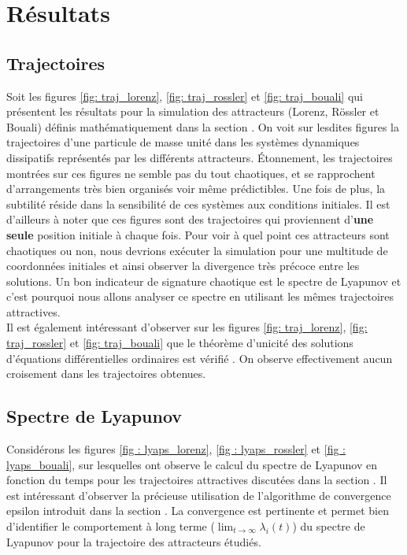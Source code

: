 \section{Résultats} \label{sec: resultats}

\subsection{Trajectoires} \label{subsec: res_trajectories}
    Soit les figures \ref{fig: traj_lorenz}, \ref{fig: traj_rossler} et
    \ref{fig: traj_bouali} qui présentent les résultats pour la simulation des
    attracteurs (Lorenz, Rössler et Bouali) définis mathématiquement dans la
    section . On voit sur lesdites figures la trajectoires
    d'une particule de masse unité dans les systèmes dynamiques dissipatifs
    représentés par les différents attracteurs. Étonnement, les trajectoires
    montrées sur ces figures ne semble pas du tout chaotiques, et se
    rapprochent d'arrangements très bien organisés voir même prédictibles. Une
    fois de plus, la subtilité réside dans la sensibilité de ces systèmes aux
    conditions initiales. Il est d'ailleurs à noter que ces figures sont des
    trajectoires qui proviennent d'\textbf{une seule} position initiale à
    chaque fois. Pour voir à quel point ces attracteurs sont chaotiques ou non,
    nous devrions exécuter la simulation pour une multitude de coordonnées
    initiales et ainsi observer la divergence très précoce entre les solutions.
    Un bon indicateur de signature chaotique est le spectre de Lyapunov et
    c'est pourquoi nous allons analyser ce spectre en utilisant les mêmes
    trajectoires attractives. \\

    Il est également intéressant d'observer sur les figures
    \ref{fig: traj_lorenz}, \ref{fig: traj_rossler} et \ref{fig: traj_bouali}
    que le théorème d'unicité des solutions d'équations différentielles
    ordinaires est vérifié \cite{uniqueness}. On observe effectivement aucun
    croisement dans les trajectoires obtenues.

\subsection{Spectre de Lyapunov} \label{subsec: res_lyapunov}
    Considérons les figures \ref{fig : lyaps_lorenz},
    \ref{fig : lyaps_rossler} et \ref{fig : lyaps_bouali}, sur lesquelles ont
    observe le calcul du spectre de Lyapunov en fonction du temps pour les
    trajectoires attractives discutées dans la section
    . Il est intéressant d'observer la
    précieuse utilisation de l'algorithme de convergence epsilon introduit dans
    la section . La convergence est pertinente et
    permet bien d'identifier le comportement à long terme
    ($\lim_{t\to\infty}\lambda_i(t)$) du spectre de Lyapunov pour la
    trajectoire des attracteurs étudiés. \\

